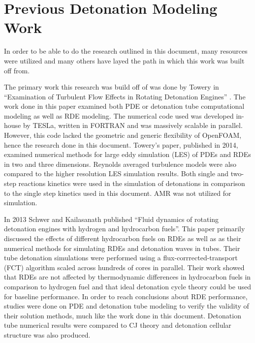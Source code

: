 
\section{Previous Detonation Modeling Work}
In order to be able to do the research outlined in this document, many resources were utilized and many others have layed the path in which this work was built off from. 

The primary work this research was build off of was done by Towery in ``Examination of Turbulent Flow Effects in Rotating Detonation Engines'' \cite{towery1}. The work done in this paper examined both PDE or detonation tube computational modeling as well as RDE modeling. The numerical code used was developed in-house by TESLa, written in FORTRAN and was massively scalable in parallel. However, this code lacked the geometric and generic flexibility of OpenFOAM, hence the research done in this document. Towery's paper, published in 2014, examined numerical methods for large eddy simulation (LES) of PDEs and RDEs in two and three dimensions. Reynolds averaged turbulence models were also compared to the higher resolution LES simulation results. Both single and two-step reactions kinetics were used in the simulation of detonations in comparison to the single step kinetics used in this document. AMR was not utilized for simulation. 

In 2013 Schwer and Kailasanath published ``Fluid dynamics of rotating detonation engines with hydrogen and hydrocarbon fuels''\cite{schwer1}. This paper primarily discussed the effects of different hydrocarbon fuels on RDEs as well as as their numerical methods for simulating RDEs and detonation waves in tubes. Their tube detonation simulations were performed using a flux-corrrected-transport (FCT) algorithm scaled across hundreds of cores in parallel. Their work showed that RDEs are not affected by thermodynamic differences in hydrocarbon fuels in comparison to hydrogen fuel and that ideal detonation cycle theory could be used for baseline performance. In order to reach conclusions about RDE performance, studies were done on PDE and detonation tube modeling to verify the validity of their solution methods, much like the work done in this document. Detonation tube numerical results were compared to CJ theory and detonation cellular structure was also produced. 

